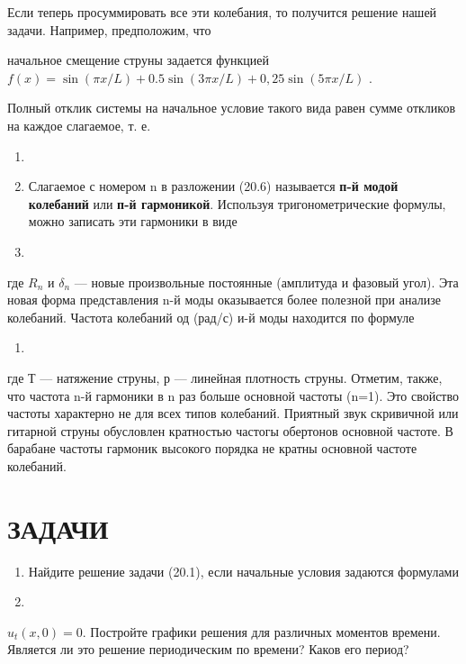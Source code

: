 \documentclass[
  ukrainian,
]{article}
\providecommand{\tightlist}{%
  \setlength{\itemsep}{0pt}\setlength{\parskip}{0pt}}
\begin{document}
Если теперь просуммировать все эти колебания, то получится решение нашей
задачи. Например, предположим, что

начальное смещение струны задается функцией
\(f(x) = \sin(\pi x/L) + 0.5 \sin(3\pi x/ L) + 0,25 \sin(5\pi x/L)\) .

Полный отклик системы на начальное условие такого вида равен сумме
откликов на каждое слагаемое, т. е.

\begin{enumerate}
\def\labelenumi{\arabic{enumi}.}
\setcounter{enumi}{17}
\item
\item
  Слагаемое с номером n в разложении (20.6) называется \textbf{п-й модой
  колебаний} или \textbf{п-й гармоникой}. Используя тригонометрические
  формулы, можно записать эти гармоники в виде
\item
\end{enumerate}

где \(R_n\) и \(\delta_n\) --- новые произвольные постоянные (амплитуда
и фазовый угол). Эта новая форма представления n-й моды оказывается
более полезной при анализе колебаний. Частота колебаний од (рад/с) и-й
моды находится по формуле

\begin{enumerate}
\def\labelenumi{\arabic{enumi}.}
\setcounter{enumi}{9}
\tightlist
\item
\end{enumerate}

где Т --- натяжение струны, р --- линейная плотность струны. Отметим,
также, что частота n-й гармоники в n раз больше основной частоты (n=1).
Это свойство частоты характерно не для всех типов колебаний. Приятный
звук скривичной или гитарной струны обусловлен кратностью частогы
обертонов основной частоте. В барабане частоты гармоник высокого порядка
не кратны основной частоте колебаний.

\section{ЗАДАЧИ}\label{ux437ux430ux434ux430ux447ux438-7}

\begin{enumerate}
\def\labelenumi{\arabic{enumi}.}
\item
  Найдите решение задачи (20.1), если начальные условия задаются
  формулами
\item
\end{enumerate}

\(u_t(x, 0) = 0.\) Постройте графики решения для различных моментов
времени. Является ли это решение периодическим по времени? Каков его
период?
\end{document}
